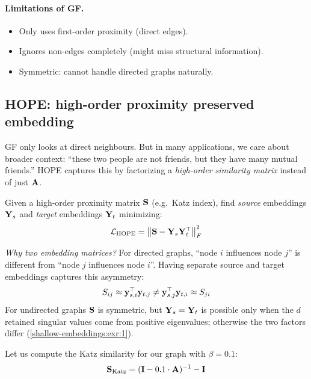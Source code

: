 \begin{notechapter}
\paragraph{Limitations of GF.}
\begin{itemize}
    \item Only uses first-order proximity (direct edges).
    \item Ignores non-edges completely (might miss structural information).
    \item Symmetric: cannot handle directed graphs naturally.
\end{itemize}

\subsection{HOPE: high-order proximity preserved embedding}

\begin{intuition}[Motivation]
GF only looks at direct neighbours. But in many applications, we care about broader context: ``these two people are not friends, but they have many mutual friends.'' HOPE captures this by factorizing a \emph{high-order similarity matrix} instead of just $\mathbf{A}$.
\end{intuition}

\begin{definition}
Given a high-order proximity matrix $\mathbf{S}$ (e.g.\ Katz index), find \emph{source} embeddings $\mathbf{Y}_s$ and \emph{target} embeddings $\mathbf{Y}_t$ minimizing:
\[
\mathcal{L}_{\text{HOPE}} = \left\| \mathbf{S} - \mathbf{Y}_s \mathbf{Y}_t^\top \right\|_F^2
\]
\end{definition}

\begin{keyidea}
\emph{Why two embedding matrices?} For directed graphs, ``node $i$ influences node $j$'' is different from ``node $j$ influences node $i$''. Having separate source and target embeddings captures this asymmetry:
\[
S_{ij} \approx \mathbf{y}_{s,i}^\top \mathbf{y}_{t,j} \neq \mathbf{y}_{s,j}^\top \mathbf{y}_{t,i} \approx S_{ji}
\]
For undirected graphs $\mathbf{S}$ is symmetric, but $\mathbf{Y}_s = \mathbf{Y}_t$ is possible only when the $d$ retained singular values come from positive eigenvalues; otherwise the two factors differ (\cref{shallow-embeddings:exr:1}).
\end{keyidea}

\begin{example}
Let us compute the Katz similarity for our graph with $\beta = 0.1$:
\[
\mathbf{S}_{\text{Katz}} = (\mathbf{I} - 0.1 \cdot \mathbf{A})^{-1} - \mathbf{I}
\]


\end{example}
\end{notechapter}
